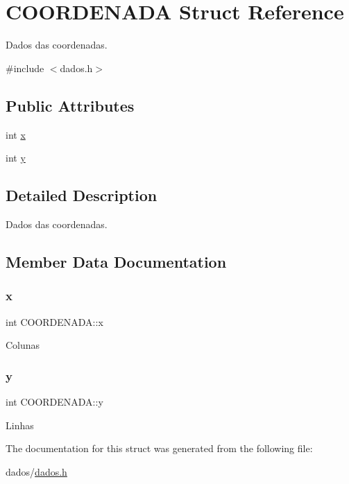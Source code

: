 \hypertarget{structCOORDENADA}{}\section{C\+O\+O\+R\+D\+E\+N\+A\+DA Struct Reference}
\label{structCOORDENADA}


Dados das coordenadas.  




{\ttfamily \#include $<$dados.\+h$>$}

\subsection*{Public Attributes}
\begin{DoxyCompactItemize}
\item 
int \hyperlink{structCOORDENADA_a04df39e5db6a15fc3891becabc22fbe2}{x}
\item 
int \hyperlink{structCOORDENADA_a5d8fd9d119daf634ccd5ff7b8b37d16b}{y}
\end{DoxyCompactItemize}


\subsection{Detailed Description}
Dados das coordenadas. 

\subsection{Member Data Documentation}
\mbox{\label{structCOORDENADA_a04df39e5db6a15fc3891becabc22fbe2}} 
\subsubsection{\texorpdfstring{x}{x}}
{\footnotesize\ttfamily int C\+O\+O\+R\+D\+E\+N\+A\+D\+A\+::x}

Colunas \mbox{\label{structCOORDENADA_a5d8fd9d119daf634ccd5ff7b8b37d16b}} 
\subsubsection{\texorpdfstring{y}{y}}
{\footnotesize\ttfamily int C\+O\+O\+R\+D\+E\+N\+A\+D\+A\+::y}

Linhas 

The documentation for this struct was generated from the following file\+:\begin{DoxyCompactItemize}
\item 
dados/\hyperlink{dados_8h}{dados.\+h}\end{DoxyCompactItemize}
